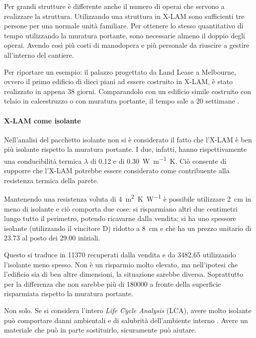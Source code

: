 Per grandi strutture è differente anche il numero di operai che servono a realizzare la struttura. Utilizzando una struttura in X-LAM sono sufficienti tre persone per una normale unità familiare. Per ottenere lo stesso quantitativo di tempo utilizzando la muratura portante, sono necessarie almeno il doppio degli operai. Avendo così più costi di manodopera e più personale da riuscire a gestire all'interno del cantiere. 

Per riportare un esempio: il palazzo progettato da Land Lease a Melbourne, ovvero il primo edificio di dieci piani ad essere costruito in X-LAM, è stato realizzato in appena 38 giorni. Comparandolo con un edificio simile costruito con telaio in calcestruzzo o con muratura portante, il tempo sale a 20 settimane \cite[39]{10storey}. 


\paragraph{X-LAM come isolante}
Nell'analisi del pacchetto isolante non si è considerato il fatto che l'X-LAM è ben più isolante rispetto la muratura portante. I due, infatti, hanno rispettivamente una conducibilità termica $\lambda$ di \SI{0.12}{} e di \SI{0.30}{W\per\metre K}.
Ciò consente di supporre che l'X-LAM potrebbe essere considerato come contribuente alla resistenza termica della parete. 

Mantenendo una resistenza voluta di \SI{4}{\square\metre K\per W} è possibile utilizzare \SI{2}{\centi\metre} in meno di isolante e ciò comporta due cose: si risparmiano altri due centimetri lungo tutto il perimetro, potendo ricavarne dalla vendita; si ha uno spessore isolante (utilizzando il vincitore D) ridotto a \SI{8}{\centi\metre} e che ha un prezzo unitario di \SI{23.73}{\teuro} al posto dei \SI{29.00}{\teuro} iniziali.

Questo si traduce in \SI{11370}{\teuro} recuperati dalla vendita e da \SI{3482.65}{\teuro} utilizzando l'isolante meno spesso. 
Non è un risparmio molto elevato, ma nell'ipotesi che l'edificio sia di ben altre dimensioni, la situazione sarebbe diversa. 
Soprattutto per la differenza che non sarebbe più di \SI{180000}{\teuro} a fronte della superficie risparmiata rispetto la muratura portante.

Non solo. 
Se si considera l'intero \textit{Life Cycle Analysis} (LCA), avere molto isolante può comportare danni ambientali e di salubrità dell'ambiente interno \cite{reijnders_comprehensiveness_1999}. 
Avere un materiale che può in parte sostituirlo, sicuramente può aiutare. 

